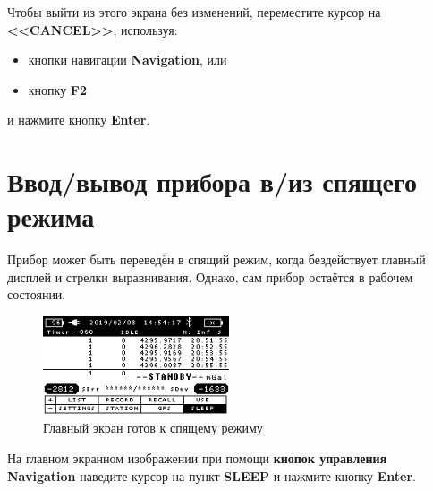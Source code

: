 Чтобы выйти из этого экрана без изменений, переместите курсор на
\textbf{<<CANCEL>>}, используя:
\begin{itemize}
  \item кнопки навигации \textbf{Navigation}, или
  \item кнопку \textbf{F2}
\end{itemize}
и нажмите кнопку \textbf{Enter}.

\section[Спящий режим]{Ввод/вывод прибора \cg{} в/из спящего режима}

Прибор \cg{} может быть переведён в спящий режим, когда бездействует главный
дисплей и стрелки выравнивания. Однако, сам прибор остаётся в рабочем состоянии.

\begin{figure}[h]
  \centering
  \includegraphics[width=0.49\textwidth]{figures/the_main_screen_ready_for_sleep_mode}
  \caption{Главный экран готов к спящему режиму}
  \label{fig:the_main_screen_ready_for_sleep_mode}
\end{figure}

На главном экранном изображении при помощи \textbf{кнопок управления Navigation}
наведите курсор на пункт \textbf{SLEEP} и нажмите кнопку \textbf{Enter}.


